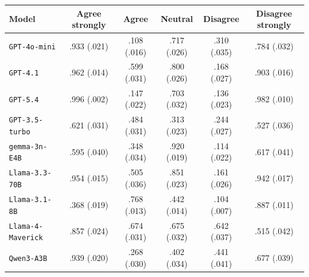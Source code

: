 \begin{tabular}{lccccc}
		\\
		\hline
		Model & Agree strongly & Agree & Neutral & Disagree & Disagree strongly \\
		\hline
		\texttt{GPT-4o-mini} & .933 (.021) & .108 (.016) & .717 (.026) & .310 (.035) & .784 (.032) \\
		\texttt{GPT-4.1} & .962 (.014) & .599 (.031) & .800 (.026) & .168 (.027) & .903 (.016) \\
		\texttt{GPT-5.4} & .996 (.002) & .147 (.022) & .703 (.032) & .136 (.023) & .982 (.010) \\
		\texttt{GPT-3.5-turbo} & .621 (.031) & .484 (.031) & .313 (.023) & .244 (.027) & .527 (.036) \\
		\texttt{gemma-3n-E4B} & .595 (.040) & .348 (.034) & .920 (.019) & .114 (.022) & .617 (.041) \\
		\texttt{Llama-3.3-70B} & .954 (.015) & .505 (.036) & .851 (.023) & .161 (.026) & .942 (.017) \\
		\texttt{Llama-3.1-8B} & .368 (.019) & .768 (.013) & .442 (.014) & .104 (.007) & .887 (.011) \\
		\texttt{Llama-4-Maverick} & .857 (.024) & .674 (.031) & .675 (.032) & .642 (.037) & .515 (.042) \\
		\texttt{Qwen3-A3B} & .939 (.020) & .268 (.030) & .402 (.034) & .441 (.041) & .677 (.039) \\
		\hline
\end{tabular}
